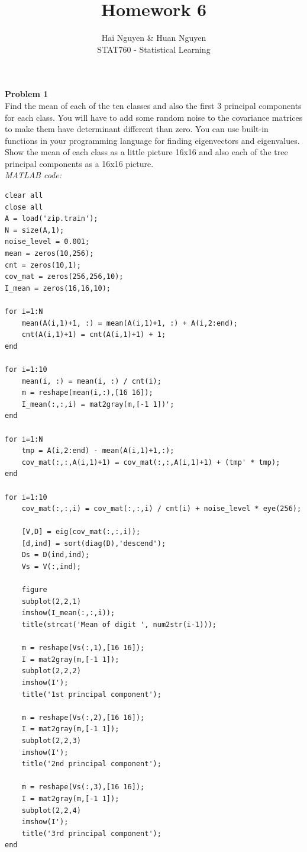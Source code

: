 \documentclass[12pt]{article}
\begin{document}
 
 
 
\title{Homework 6}%
\author{Hai Nguyen \& Huan Nguyen\\ %
STAT760 - Statistical Learning} %
\maketitle
\textbf{Problem 1}
\\Find the mean of each of the ten classes and also the first 3 principal components for
each class. You will have to add some random noise to the covariance matrices to make
them have determinant different than zero. You can use built-in functions in your
programming language for finding eigenvectors and eigenvalues.
\\Show the mean of each class as a little picture 16x16 and also each of the tree principal
components as a 16x16 picture.\\
\textit{MATLAB code:}
\begin{lstlisting}
clear all
close all
A = load('zip.train');
N = size(A,1);
noise_level = 0.001;
mean = zeros(10,256);
cnt = zeros(10,1);
cov_mat = zeros(256,256,10);
I_mean = zeros(16,16,10);

for i=1:N
    mean(A(i,1)+1, :) = mean(A(i,1)+1, :) + A(i,2:end);    
    cnt(A(i,1)+1) = cnt(A(i,1)+1) + 1;
end

for i=1:10
    mean(i, :) = mean(i, :) / cnt(i);
    m = reshape(mean(i,:),[16 16]);
    I_mean(:,:,i) = mat2gray(m,[-1 1])';
end

for i=1:N
    tmp = A(i,2:end) - mean(A(i,1)+1,:);
    cov_mat(:,:,A(i,1)+1) = cov_mat(:,:,A(i,1)+1) + (tmp' * tmp); 
end

for i=1:10
    cov_mat(:,:,i) = cov_mat(:,:,i) / cnt(i) + noise_level * eye(256);
    
    [V,D] = eig(cov_mat(:,:,i));
    [d,ind] = sort(diag(D),'descend');
    Ds = D(ind,ind);
    Vs = V(:,ind);

    figure
    subplot(2,2,1)
    imshow(I_mean(:,:,i));
    title(strcat('Mean of digit ', num2str(i-1)));    

    m = reshape(Vs(:,1),[16 16]);
    I = mat2gray(m,[-1 1]);
    subplot(2,2,2)
    imshow(I');
    title('1st principal component'); 
    
    m = reshape(Vs(:,2),[16 16]);
    I = mat2gray(m,[-1 1]);
    subplot(2,2,3)
    imshow(I');
    title('2nd principal component'); 
    
    m = reshape(Vs(:,3),[16 16]);
    I = mat2gray(m,[-1 1]);
    subplot(2,2,4)
    imshow(I');
    title('3rd principal component');     
end
\end{lstlisting}
\end{document}

